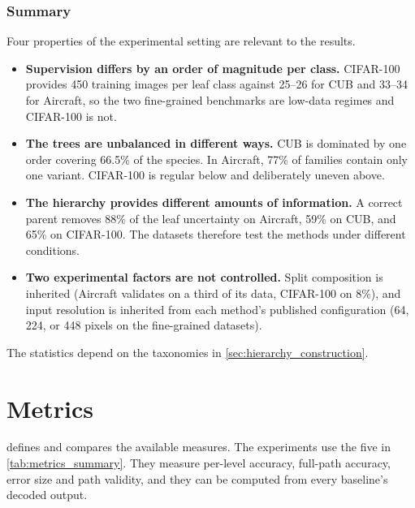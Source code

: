 \subsubsection{Summary}

Four properties of the experimental setting are relevant to the results.

\begin{itemize}[itemsep=2pt, topsep=3pt]
  \item \textbf{Supervision differs by an order of magnitude per class.} CIFAR-100 provides 450
      training images per leaf class against 25--26 for CUB and 33--34 for Aircraft, so the two
      fine-grained
      benchmarks are low-data regimes and CIFAR-100 is not.
  \item \textbf{The trees are unbalanced in different ways.} CUB is dominated by one order covering
      66.5\% of the species. In Aircraft, 77\% of families contain only one
      variant. CIFAR-100 is regular below and deliberately uneven above.
  \item \textbf{The hierarchy provides different amounts of information.} A correct parent
      removes 88\% of the leaf uncertainty on Aircraft, 59\% on CUB, and 65\% on CIFAR-100. The
      datasets therefore test the methods under different conditions.
  \item \textbf{Two experimental factors are not controlled.} Split composition is inherited
      (Aircraft validates on a third of its data, CIFAR-100 on 8\%), and input resolution is
      inherited from each method's published configuration (64, 224, or 448 pixels on the
      fine-grained datasets).
\end{itemize}

The statistics depend on the taxonomies in \cref{sec:hierarchy_construction}.

\section{Metrics}
\label{ssec:inference_metrics}

 defines and compares the available measures. The
experiments use the five in \cref{tab:metrics_summary}. They measure per-level
accuracy, full-path accuracy, error size and path validity, and they can be
computed from every baseline's decoded output.

